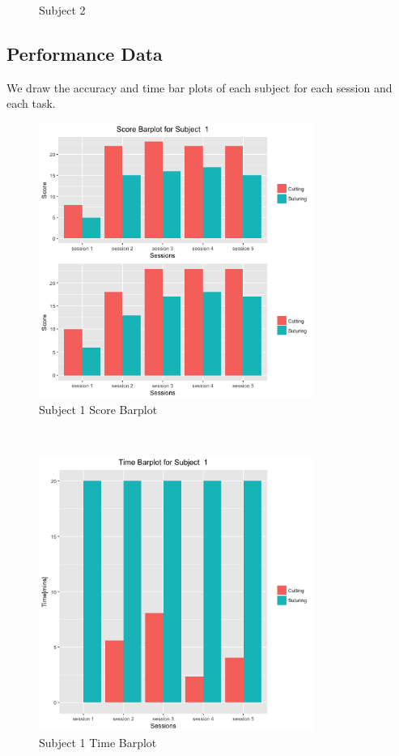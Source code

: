 \documentclass[12pt,epsf]{report}
\begin{document}
\begin{figure}[!ht]
\begin{minipage}[c]{0.5\linewidth}
	\caption{Subject 2}
	\end{minipage}
\end{figure}

\subsection*{Performance Data}
We draw the accuracy and time bar plots of each subject for each session and each task.\\
\begin{figure}[!ht]
	\centering
	\includegraphics[width=0.8\textwidth]{S1Score_barplot}
	\caption{Subject 1 Score Barplot}
	\centering
\end{figure}
\\
\begin{figure}[!ht]
	\centering
	\includegraphics[width=0.8\textwidth]{S1Time_barplot}
	\caption{Subject 1 Time Barplot}
	\centering
\end{figure}\\
\newpage
\end{document}
